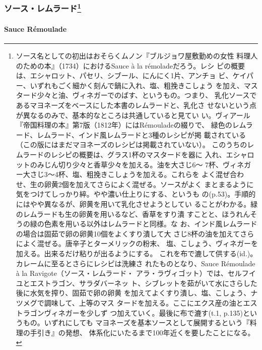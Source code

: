 \begin{recette}
{\subsubsection[ソース・レムラード]{\texorpdfstring{ソース・レムラード\footnote{ソース名としての初出はおそらくムノン『ブルジョワ屋敷勤めの女性
  料理人のための本』（1734）におけるSauce à la rémoladeだろう。レシ
  ピの概要は、エシャロット、パセリ、シブール、にんにく1片、アンチョ
  ビ、ケイパー、いずれもごく細かく刻んで鍋に入れ、塩、粗挽きこしょう
  を加え、マスタード少々と油、ヴィネガーでのばす、というもの。つまり、
  乳化ソースであるマヨネーズをベースにした本書のレムラードと、乳化さ
  せないという点が異なるのみで、基本的なところは共通していると見てい
  い。ヴィアール『帝国料理の本』第7版（1812年）にはRémouladeの綴りで、
  緑色のレムラード、レムラード、インド風レムラードと3種のレシピが掲
  載されている（この版にはまだマヨネーズのレシピは掲載されていない）。
  このうちのレムラードのレシピの概要は、グラス1杯のマスタードを器に
  入れ、エシャロットのみじん切り少々と香草少々を加える。油を大さじ6〜
  7杯、ヴィネガー大さじ3〜4杯、塩、粗挽きこしょうを加える。これらを
  よく混ぜ合わせ、生の卵黄2個を加えてさらによく混ぜる。ソースがよく
  まとまるように気をつけてしっかり綷。やや濃い仕上りにする、というも
  の(p.53)。手順的にはやや異なるが、卵黄を用いて乳化させようとしてい
  ることがわかる。緑のレムラードも生の卵黄を用いるなど、香草をすり潰
  すことと、ほうれんそうの緑の色素を用いる以外はレムラードと同様。な
  お、インド風レムラードの場合は固茹で卵の卵黄10個をよくすり潰して大
  さじ8杯の油を加えてさらによく混ぜる。唐辛子とターメリックの粉末、
  塩、こしょう、ヴィネガーを加える。出来るだけ粘りが出るようにする。
  これを布で漉して供する(id.)。カレームに至るとさらにレシピは洗練さ
  れたものとなり、Sauce Rémoulade à la Ravigote（ソース・レムラード・
  アラ・ラヴィゴット）では、セルフイユとエストラゴン、サラダバーネッ
  ト、シブレットを茹がいて水にさらした後に水気を搾り、固茹で卵の卵黄
  を加えてよくすり潰し、塩、こしょう、ナツメグで調味して、上等のマス
  タードを加える。ここにエクス産の油とエストラゴンヴィネガーを少しず
  つ加えていく。最後に布で漉す(t.1, p.135)というもの。いずれにしても
  マヨネーズを基本ソースとして展開するという『料理の手引き』の発想、
  体系化にいたるまで100年近くを要したことになる。}}{ソース・レムラード}}\label{ux30bdux30fcux30b9ux30ecux30e0ux30e9ux30fcux30c934}}

\hypertarget{sauce-remoulade}{%
\paragraph{Sauce Rémoulade}\label{sauce-remoulade}}


\end{recette}
